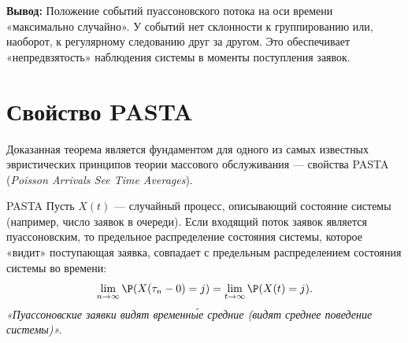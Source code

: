 \begin{center}
\end{center}

\textbf{Вывод:} Положение событий пуассоновского потока на оси времени «максимально случайно». У событий нет склонности к группированию или, наоборот, к регулярному следованию друг за другом. Это обеспечивает «непредвзятость» наблюдения системы в моменты поступления заявок.

\section{Свойство PASTA}

Доказанная теорема является фундаментом для одного из самых известных эвристических принципов теории массового обслуживания — свойства PASTA (\textit{Poisson Arrivals See Time Averages}).

\begin{theorem}{PASTA}
Пусть $X(t)$ — случайный процесс, описывающий состояние системы (например, число заявок в очереди). Если входящий поток заявок является пуассоновским, то предельное распределение состояния системы, которое «видит» поступающая заявка, совпадает с предельным распределением состояния системы во времени:
$$
\lim_{n \to \infty} \P(X(\tau_n - 0) = j) = \lim_{t \to \infty} \P(X(t) = j).
$$
\textit{«Пуассоновские заявки видят временн\'{ы}е средние (видят среднее поведение системы)».}
\end{theorem}


